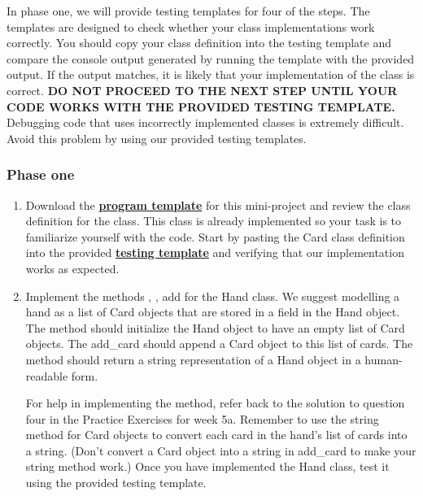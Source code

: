 \documentclass[a4paper,14pt]{article}
\begin{document}
\begin{CJK}{UTF8}{gkai}
\noindent In phase one, we will provide testing templates for four of the steps. The templates are designed to check whether your class implementations work correctly. You should copy your class definition into the testing template and compare the console output generated by running the template with the provided output. If the output matches, it is likely that your implementation of the class is correct. \textbf{DO NOT PROCEED TO THE NEXT STEP UNTIL YOUR CODE WORKS WITH THE PROVIDED TESTING TEMPLATE.} Debugging code that uses incorrectly implemented classes is extremely difficult. Avoid this problem by using our provided testing templates.


\subsubsection*{Phase one}

\begin{enumerate}

\item \noindent Download the \href{http://www.codeskulptor.org/#examples-blackjack_template.py}{\textbf{program template}} for this mini-project and review the class definition for the {\color{red}{Card}} class. This class is already implemented so your task is to familiarize yourself with the code. Start by pasting the Card class definition into the provided \href{http://www.codeskulptor.org/#examples-card_template.py}{\textbf{testing template}} and verifying that our implementation works as expected.

\item \noindent Implement the methods {\color{red}{\_\_init\_\_}}, {\color{red}{{\color{red}{add\_card}}}}, add{\color{red}{\_card}} for the Hand class. We suggest modelling a hand as a list of Card objects that are stored in a field in the Hand object. The {\color{red}{\_\_init\_\_}} method should initialize the Hand object to have an empty list of Card objects. The add\_card should append a Card object to this list of cards. The {\color{red}{{\color{red}{add\_card}}}} method should return a string representation of a Hand object in a human-readable form.

\noindent For help in implementing the {\color{red}{{\color{red}{add\_card}}}} method, refer back to the solution to question four in the Practice Exercises for week 5a. Remember to use the string method for Card objects to convert each card in the hand's list of cards into a string. (Don't convert a Card object into a string in add\_card to make your string method work.) Once you have implemented the Hand class, test it using the provided testing template.


\end{enumerate}
\end{CJK}
\end{document}
